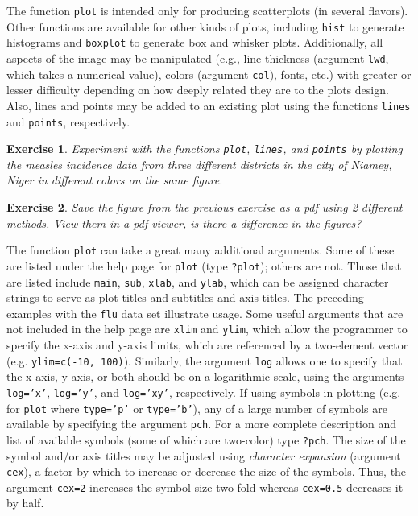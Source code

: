 \documentclass{article}\usepackage[]{graphicx}\usepackage[]{color}
\newcommand{\code}[1]{\texttt{#1}}
\theoremstyle{exercise}
\newtheorem{exercise}{Exercise}
\begin{document}
The function \code{plot} is intended only for producing scatterplots (in several flavors). Other functions are available for other kinds of plots, including \code{hist} to generate histograms and \code{boxplot} to generate box and whisker plots. Additionally, all aspects of the image may be manipulated (e.g., line thickness (argument \code{lwd}, which takes a numerical value), colors (argument \code{col}), fonts, etc.) with greater or lesser difficulty depending on how deeply related they are to the plots design. Also, lines and points may be added to an existing plot using the functions \code{lines} and \code{points}, respectively.

\begin{exercise}
  Experiment with the functions \code{plot}, \code{lines}, and \code{points} by plotting the measles incidence data from three different districts in the city of Niamey, Niger in different colors on the same figure.
\end{exercise}

\begin{exercise}
  Save the figure from the previous exercise as a pdf using 2 different methods. View them in a pdf viewer, is there a difference in the figures?
\end{exercise}

The function \code{plot} can take a great many additional arguments. Some of these are listed under the help page for \code{plot} (type \code{?plot}); others are not. Those that are listed include \code{main}, \code{sub}, \code{xlab}, and \code{ylab}, which can be assigned character strings to serve as plot titles and subtitles and axis titles. The preceding examples with the \code{flu} data set illustrate usage. Some useful arguments that are not included in the help page are \code{xlim} and \code{ylim}, which allow the programmer to specify the x-axis and y-axis limits, which are referenced by a two-element vector (e.g. \code{ylim=c(-10, 100)}). Similarly, the argument \code{log} allows one to specify that the x-axis, y-axis, or both should be on a logarithmic scale, using the arguments \code{log='x'}, \code{log='y'}, and \code{log='xy'}, respectively. If using symbols in plotting (e.g. for \code{plot} where \code{type='p'} or \code{type='b'}), any of a large number of symbols are available by specifying the argument \code{pch}. For a more complete description and list of available symbols (some of which are two-color) type \code{?pch}. The size of the symbol and/or axis titles may be adjusted using \textit{character expansion} (argument \code{cex}), a factor by which to increase or decrease the size of the symbols. Thus, the argument \code{cex=2} increases the symbol size two fold whereas \code{cex=0.5} decreases it by half.
\end{document}
